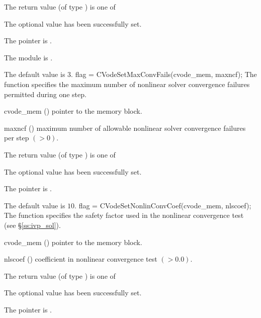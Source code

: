 {
  The return value  (of type ) is one of
  \begin{args}
  \item[\Id{CV\_SUCCESS}]
    The optional value has been successfully set.
  \item[\Id{CV\_MEM\_NULL}]
    The  pointer is .
  \item[\Id{CV\_MEM\_FAIL}]
    The {\sunnonlinsol} module is .
  \end{args}
}
{
  The default value is $3$.
}
{
flag = CVodeSetMaxConvFails(cvode\_mem, maxncf);
}
{
  The function  specifies the
  maximum number of nonlinear solver convergence failures permitted during
  one step.
}
{
  \begin{args}
  \item[cvode\_mem] ()
    pointer to the {\cvodes} memory block.
  \item[maxncf] ()
    maximum number of allowable nonlinear solver convergence failures
    per step $( > 0)$.
  \end{args}
}
{
  The return value  (of type ) is one of
  \begin{args}
  \item[\Id{CV\_SUCCESS}]
    The optional value has been successfully set.
  \item[\Id{CV\_MEM\_NULL}]
    The  pointer is .
  \end{args}
}
{
  The default value is $10$.
}
{
flag = CVodeSetNonlinConvCoef(cvode\_mem, nlscoef);
}
{
  The function  specifies the safety factor used
  in the nonlinear convergence test (see \S\ref{ss:ivp_sol}).
}
{
  \begin{args}
  \item[cvode\_mem] ()
    pointer to the {\cvodes} memory block.
  \item[nlscoef] ()
    coefficient in nonlinear convergence test $( > 0.0)$.
  \end{args}
}
{
  The return value  (of type ) is one of
  \begin{args}
  \item[\Id{CV\_SUCCESS}]
    The optional value has been successfully set.
  \item[\Id{CV\_MEM\_NULL}]
    The  pointer is .
  \end{args}
}
